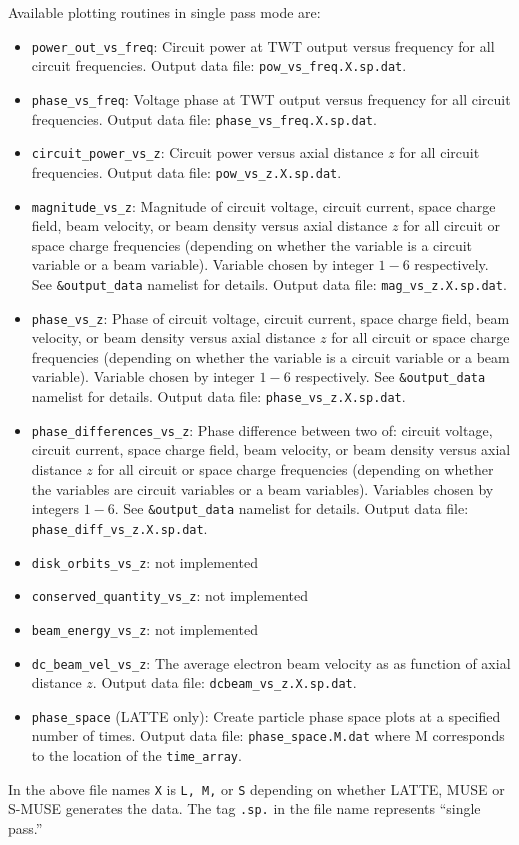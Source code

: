 \documentclass{article}
\begin{document}
Available plotting routines in single pass mode are:
\begin{itemize}
\item {\tt power\_out\_vs\_freq}: Circuit power at TWT output versus frequency
  for all circuit frequencies. Output data file: {\tt pow\_vs\_freq.X.sp.dat}.
\item {\tt phase\_vs\_freq}: Voltage phase at TWT output versus frequency
  for all circuit frequencies. Output data file:
  {\tt phase\_vs\_freq.X.sp.dat}.
\item {\tt circuit\_power\_vs\_z}: Circuit power versus axial distance $z$ for
  all circuit frequencies. Output data file: {\tt pow\_vs\_z.X.sp.dat}.
\item {\tt magnitude\_vs\_z}: Magnitude of circuit voltage, circuit current,
  space charge field, beam velocity, or beam density versus axial
  distance $z$ for all circuit or space charge frequencies (depending on
  whether the variable is a circuit variable or a beam variable). Variable
  chosen by integer $1-6$ respectively. See {\tt \&output\_data} namelist
  for details. Output data file: {\tt mag\_vs\_z.X.sp.dat}.
\item {\tt phase\_vs\_z}: Phase of circuit voltage, circuit current, space
  charge field, beam velocity, or beam density versus axial distance $z$ for
  all circuit or space charge frequencies (depending on whether the variable
  is a circuit variable or a beam variable). Variable chosen by
  integer $1-6$ respectively. See {\tt \&output\_data} namelist for details.
  Output data file: {\tt phase\_vs\_z.X.sp.dat}.
\item {\tt phase\_differences\_vs\_z}: Phase difference between two of:
  circuit voltage, circuit current, space charge field, beam velocity,
  or beam density versus axial distance $z$ for all circuit or space charge
  frequencies (depending on whether the variables are circuit
  variables or a beam variables). Variables chosen by integers $1-6$.
  See {\tt \&output\_data} namelist for details.
  Output data file: {\tt phase\_diff\_vs\_z.X.sp.dat}.
\item {\tt disk\_orbits\_vs\_z}: not implemented
\item {\tt conserved\_quantity\_vs\_z}: not implemented
\item {\tt beam\_energy\_vs\_z}: not implemented
\item {\tt dc\_beam\_vel\_vs\_z}: The average electron beam velocity as
  as function of axial distance $z$.
  Output data file: {\tt dcbeam\_vs\_z.X.sp.dat}.
\item {\tt phase\_space} (LATTE only): Create particle phase space plots
  at a specified number of times.
  Output data file: {\tt phase\_space.M.dat} where M corresponds to the
  location of the {\tt time\_array}.
\end{itemize}
In the above file names {\tt X} is {\tt L, M,} or {\tt S} depending
on whether LATTE, MUSE or S-MUSE generates the data. The tag {\tt .sp.}
in the file name represents ``single pass.''
\end{document}
